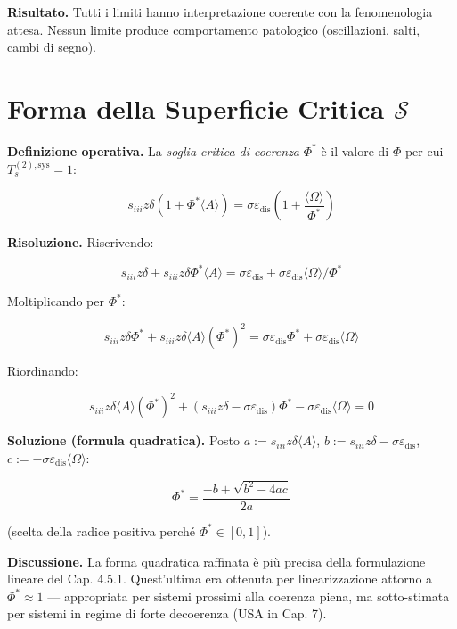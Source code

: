 \Proved{} \textbf{Risultato.} Tutti i limiti hanno interpretazione
coerente con la fenomenologia attesa. Nessun limite produce
comportamento patologico (oscillazioni, salti, cambi di segno).



\section{\texorpdfstring{Forma della Superficie Critica
\(\mathcal{S}\)}{Forma della Superficie Critica \textbackslash mathcal\{S\}}}\label{forma-della-superficie-critica-mathcals}

\Hypoth{} \textbf{Definizione operativa.} La \emph{soglia critica di
coerenza} \(\Phi^*\) è il valore di \(\Phi\) per cui
\(T_s^{(2),\text{sys}} = 1\):

\[
s_{iii} z \delta (1 + \Phi^* \langle A\rangle) = \sigma \varepsilon_{\text{dis}} \left(1 + \frac{\langle\Omega\rangle}{\Phi^*}\right)
\]

\Proved{} \textbf{Risoluzione.} Riscrivendo:

\[
s_{iii} z \delta + s_{iii} z \delta \Phi^* \langle A\rangle = \sigma \varepsilon_{\text{dis}} + \sigma \varepsilon_{\text{dis}} \langle\Omega\rangle / \Phi^*
\]

Moltiplicando per \(\Phi^*\):

\[
s_{iii} z \delta \Phi^* + s_{iii} z \delta \langle A\rangle (\Phi^*)^2 = \sigma\varepsilon_{\text{dis}}\Phi^* + \sigma\varepsilon_{\text{dis}}\langle\Omega\rangle
\]

Riordinando:

\[
s_{iii} z \delta \langle A\rangle (\Phi^*)^2 + (s_{iii}z\delta - \sigma\varepsilon_{\text{dis}}) \Phi^* - \sigma\varepsilon_{\text{dis}}\langle\Omega\rangle = 0
\]

\Proved{} \textbf{Soluzione (formula quadratica).} Posto
\(a := s_{iii}z\delta\langle A\rangle\),
\(b := s_{iii}z\delta - \sigma\varepsilon_{\text{dis}}\),
\(c := -\sigma\varepsilon_{\text{dis}}\langle\Omega\rangle\):

\[
\boxed{\Phi^* = \frac{-b + \sqrt{b^2 - 4ac}}{2a}}
\]

(scelta della radice positiva perché \(\Phi^* \in [0,1]\)).

\Hypoth{} \textbf{Discussione.} La forma quadratica raffinata è più
precisa della formulazione lineare del Cap. 4.5.1. Quest'ultima era
ottenuta per linearizzazione attorno a \(\Phi^* \approx 1\) ---
appropriata per sistemi prossimi alla coerenza piena, ma sotto-stimata
per sistemi in regime di forte decoerenza (USA in Cap. 7).


